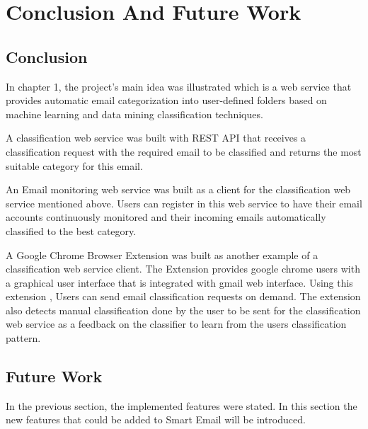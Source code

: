 
\chapter{Conclusion And Future Work} %

\label{Chapter7} %




\section{Conclusion}
In chapter 1, the project's main idea was illustrated which
is a web service that provides automatic email categorization into
user-defined folders based on machine learning and data mining
classification techniques.

A classification web service was built with REST API \cite{REST} that receives
a classification request with the required email to be classified and returns
the most suitable category for this email.

An Email monitoring web service was built as a client for the classification
web service mentioned above. Users can register in this web service to have
their email accounts continuously monitored and their incoming emails automatically
classified to the best category.

A Google Chrome Browser \cite{CHROME} Extension was built as another example of a
classification web service client. The Extension provides google chrome users
with a graphical user interface that is integrated with gmail web interface.
Using this extension , Users can send email classification requests on demand.
The extension also detects manual classification done by the user to be sent
for the classification web service as a feedback on the classifier to learn
from the users classification pattern.
\section{Future Work}
In the previous section, the implemented features were stated. In this section
the new features that could be added to Smart Email will be introduced.

